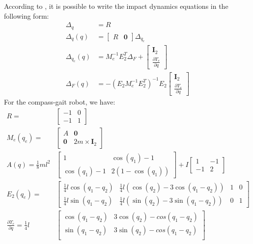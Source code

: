 According to \cite{westervelt2007feedback}, it is possible to write the impact dynamics equations in the following form:
\begin{align*}
	\Delta_q &= R \\
	\Delta_{\dot{q}}(q) &= \begin{bmatrix}
		R & \mathbf{0}
	\end{bmatrix} \Delta_{\dot{q}_e} \\
	\Delta_{\dot{q}_e}(q) &= M_e^{-1}E_2^T\Delta_{F} + \begin{bmatrix}
		\mathbf{I}_2                          \\
		\frac{\partial\Upsilon_e}{\partial q}
	\end{bmatrix} \\
	\Delta_F(q) &= -(E_2M_e^{-1}E_2^T)^{-1}E_2\begin{bmatrix}
		\mathbf{I}_2 \\ \frac{\partial\Upsilon_e}{\partial q}
	\end{bmatrix}
\end{align*}
For the compass-gait robot, we have:
\begin{align*}
	R = &\begin{bmatrix}
		-1 & 0 \\ -1 & 1
	\end{bmatrix} \\
	M_e(q_e) = &\begin{bmatrix}
		A & \mathbf{0} \\ \mathbf{0} & 2m\times\mathbf{I}_{2}
	\end{bmatrix} \\
	A(q) = \tfrac{1}{8}ml^2 &\begin{bmatrix}
		1 & \cos(q_1) - 1 \\
		\cos(q_1) - 1 & 2(1-\cos(q_1))
	\end{bmatrix} + I\begin{bmatrix}
		1 & -1 \\ -1 & 2
	\end{bmatrix} \\
	E_2(q_e) = &\begin{bmatrix}
		\tfrac{1}{4}l\cos(q_1-q_2) & \tfrac{1}{4}l(\cos(q_2) - 3\cos(q_1-q_2)) & 1 & 0 \\
		\tfrac{1}{4}l\sin(q_1-q_2) & \tfrac{1}{4}l(\sin(q_2) - 3\sin(q_1-q_2)) & 0 & 1
	\end{bmatrix} \\
	\frac{\partial\Upsilon_e}{\partial q} = \tfrac{1}{4}l & \begin{bmatrix}
		\cos(q_1 - q_2) & 3\cos(q_2)-cos(q_1-q_2) \\
		\sin(q_1 - q_2) & 3\sin(q_2)-cos(q_1-q_2) \\
	\end{bmatrix}
\end{align*}

